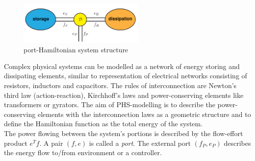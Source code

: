 \documentclass[a4paper,twoside, openright,12pt]{report}
\begin{document}
\begin{figure}[htb]
	\centering
	\includegraphics[width=0.55\textwidth]{diracstructure.png}
	\caption[port-Hamiltonian system structure]{port-Hamiltonian system structure \cite{vanderSchaft_06}}
	\label{FIG:pHsstructure}
\end{figure}

Complex physical systems can be modelled as a network of energy storing and dissipating elements, similar to representation of electrical networks consisting of resistors, inductors and capacitors. The rules of interconnection are Newton's third law (action-reaction), Kirchhoff's laws and power-conserving elements like transformers or gyrators. The aim of PHS-modelling is to describe the power-conserving elements with the interconnection laws as a geometric structure and to define the Hamiltonian function as the total energy of the system. \\
The power flowing between the system's portions is described by the flow-effort product $e^Tf$. A pair $(f,e)$ is called a \emph{port}. The external port $(f_P,e_P)$ describes the energy flow to/from environment or a controller. 
\end{document}
